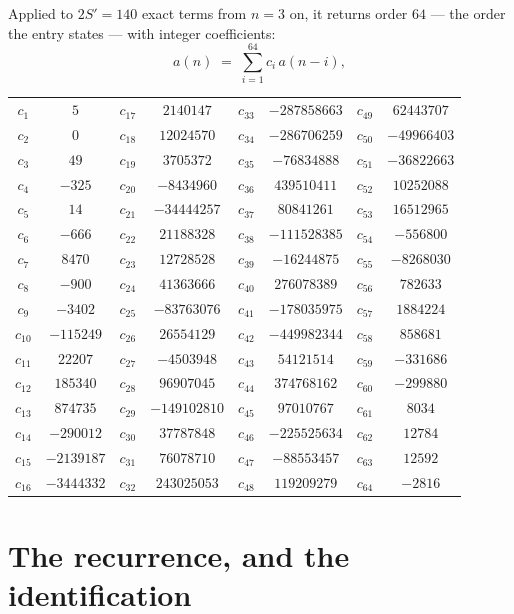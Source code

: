 \documentclass[11pt,a4paper]{article}
\theoremstyle{plain}
\theoremstyle{definition}
\begin{document}
Applied to $2S'=140$ exact terms from $n=3$ on, it returns order $64$ --- the
order the entry states --- with integer coefficients:
\[
a(n)\;=\;\sum_{i=1}^{64}c_i\,a(n-i),
\]
\begin{center}\small
\begin{tabular}{cccccccc}
$c_{1}$ & $5$ & $c_{17}$ & $2140147$ & $c_{33}$ & $-287858663$ & $c_{49}$ & $62443707$ \\
$c_{2}$ & $0$ & $c_{18}$ & $12024570$ & $c_{34}$ & $-286706259$ & $c_{50}$ & $-49966403$ \\
$c_{3}$ & $49$ & $c_{19}$ & $3705372$ & $c_{35}$ & $-76834888$ & $c_{51}$ & $-36822663$ \\
$c_{4}$ & $-325$ & $c_{20}$ & $-8434960$ & $c_{36}$ & $439510411$ & $c_{52}$ & $10252088$ \\
$c_{5}$ & $14$ & $c_{21}$ & $-34444257$ & $c_{37}$ & $80841261$ & $c_{53}$ & $16512965$ \\
$c_{6}$ & $-666$ & $c_{22}$ & $21188328$ & $c_{38}$ & $-111528385$ & $c_{54}$ & $-556800$ \\
$c_{7}$ & $8470$ & $c_{23}$ & $12728528$ & $c_{39}$ & $-16244875$ & $c_{55}$ & $-8268030$ \\
$c_{8}$ & $-900$ & $c_{24}$ & $41363666$ & $c_{40}$ & $276078389$ & $c_{56}$ & $782633$ \\
$c_{9}$ & $-3402$ & $c_{25}$ & $-83763076$ & $c_{41}$ & $-178035975$ & $c_{57}$ & $1884224$ \\
$c_{10}$ & $-115249$ & $c_{26}$ & $26554129$ & $c_{42}$ & $-449982344$ & $c_{58}$ & $858681$ \\
$c_{11}$ & $22207$ & $c_{27}$ & $-4503948$ & $c_{43}$ & $54121514$ & $c_{59}$ & $-331686$ \\
$c_{12}$ & $185340$ & $c_{28}$ & $96907045$ & $c_{44}$ & $374768162$ & $c_{60}$ & $-299880$ \\
$c_{13}$ & $874735$ & $c_{29}$ & $-149102810$ & $c_{45}$ & $97010767$ & $c_{61}$ & $8034$ \\
$c_{14}$ & $-290012$ & $c_{30}$ & $37787848$ & $c_{46}$ & $-225525634$ & $c_{62}$ & $12784$ \\
$c_{15}$ & $-2139187$ & $c_{31}$ & $76078710$ & $c_{47}$ & $-88553457$ & $c_{63}$ & $12592$ \\
$c_{16}$ & $-3444332$ & $c_{32}$ & $243025053$ & $c_{48}$ & $119209279$ & $c_{64}$ & $-2816$ \\
\end{tabular}
\end{center}

\section{The recurrence, and the identification}
\end{document}

